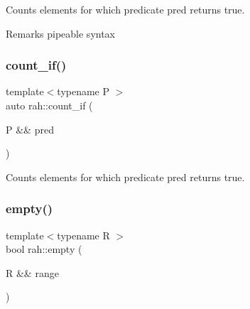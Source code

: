 Counts elements for which predicate pred returns true. 

\begin{DoxyRemark}{Remarks}
pipeable syntax
\end{DoxyRemark}

\begin{DoxyCodeInclude}{0}
\end{DoxyCodeInclude}
\mbox{\label{namespacerah_a9e22b56a1f28a353659fed572f33f5a9}} 
\subsubsection{\texorpdfstring{count\_if()}{count\_if()}\hspace{0.1cm}{\footnotesize\ttfamily [2/2]}}
{\footnotesize\ttfamily template$<$typename P $>$ \\
auto rah\+::count\+\_\+if (\begin{DoxyParamCaption}\item[{P \&\&}]{pred }\end{DoxyParamCaption})}



Counts elements for which predicate pred returns true. 


\begin{DoxyCodeInclude}{0}
\end{DoxyCodeInclude}
\mbox{\label{namespacerah_a51feb1497566c28de396f50735fd259b}} 
\subsubsection{\texorpdfstring{empty()}{empty()}\hspace{0.1cm}{\footnotesize\ttfamily [1/2]}}
{\footnotesize\ttfamily template$<$typename R $>$ \\
bool rah\+::empty (\begin{DoxyParamCaption}\item[{R \&\&}]{range }\end{DoxyParamCaption})}



